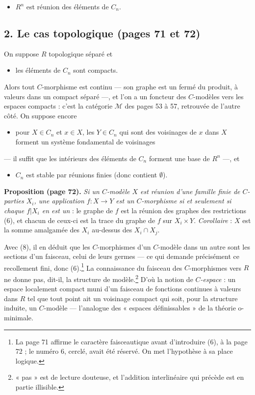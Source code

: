 \documentclass[11pt,a4paper]{article}
\begin{document}
\begin{itemize}
\item[(5)] $R^n$ est réunion des éléments de $C_n$.
\end{itemize}

\subsection*{2. Le cas topologique (pages 71 et 72)}

On suppose $R$ topologique séparé et

\begin{itemize}
\item[(7)] les éléments de $C_n$ sont compacts.
\end{itemize}

Alors tout $C$-morphisme est continu — son graphe est un fermé du produit, à
valeurs dans un compact séparé —, et l'on a un foncteur des $C$-modèles vers
les espaces compacts : c'est la catégorie $\mathcal{M}$ des pages 53 à 57,
retrouvée de l'autre côté. On suppose encore

\begin{itemize}
\item[(8)] pour $X \in C_n$ et $x \in X$, les $Y \in C_n$ qui sont des
  voisinages de $x$ dans $X$ forment un système fondamental de voisinages
\end{itemize}

— il suffit que les intérieurs des éléments de $C_n$ forment une base de
$R^n$ —, et

\begin{itemize}
\item[(6)] $C_n$ est stable par réunions finies (donc contient $\emptyset$).
\end{itemize}

\textbf{Proposition (page 72).} \emph{Si un $C$-modèle $X$ est réunion d'une
famille finie de $C$-parties $X_i$, une application $f : X \to Y$ est un
$C$-morphisme si et seulement si chaque $f|X_i$ en est un} : le graphe de $f$
est la réunion des graphes des restrictions (6), et chacun de ceux-ci est la
trace du graphe de $f$ sur $X_i \times Y$. \emph{Corollaire} : $X$ est la somme
amalgamée des $X_i$ au-dessus des $X_i \cap X_j$.

Avec (8), il en déduit que les $C$-morphismes d'un $C$-modèle dans un autre
sont les sections d'un faisceau, celui de leurs germes — ce qui demande
précisément ce recollement fini, donc (6).\footnote{La page 71 affirme le
caractère faisceautique avant d'introduire (6), à la page 72 ; le numéro 6,
cerclé, avait été réservé. On met l'hypothèse à sa place logique.} La
connaissance du faisceau des $C$-morphismes vers $R$ ne donne
pas, dit-il, la structure de modèle.\footnote{« pas » est de lecture douteuse,
et l'addition interlinéaire qui précède est en partie illisible.} D'où la
notion de \emph{$C$-espace} : un espace localement compact muni d'un faisceau
de fonctions continues à valeurs dans $R$ tel que tout point ait un voisinage
compact qui soit, pour la structure induite, un $C$-modèle — l'analogue des
« espaces définissables » de la théorie o-minimale.
\end{document}
